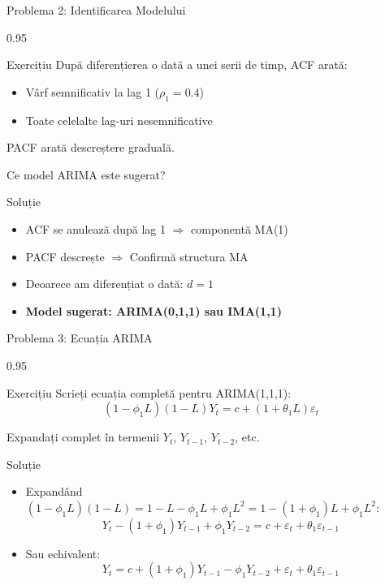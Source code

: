 \documentclass[9pt, aspectratio=169, t]{beamer}
\begin{document}
\begin{frame}{Problema 2: Identificarea Modelului}
    \begin{cminipage}{0.95\textwidth}
    \begin{block}{Exercițiu}
        După diferențierea o dată a unei serii de timp, ACF arată:
        \begin{itemize}\setlength{\itemsep}{0pt}
            \item Vârf semnificativ la lag 1 ($\rho_1 = 0.4$)
            \item Toate celelalte lag-uri nesemnificative
        \end{itemize}
        PACF arată descreștere graduală.

        Ce model ARIMA este sugerat?
    \end{block}

    \vspace{0.3cm}
    \pause
    \begin{exampleblock}{Soluție}
        \begin{itemize}\setlength{\itemsep}{0pt}
            \item ACF se anulează după lag 1 $\Rightarrow$ componentă MA(1)
            \item PACF descrește $\Rightarrow$ Confirmă structura MA
            \item Deoarece am diferențiat o dată: $d = 1$
            \item \textbf{Model sugerat: ARIMA(0,1,1) sau IMA(1,1)}
        \end{itemize}
    \end{exampleblock}
    \end{cminipage}
\end{frame}

\begin{frame}{Problema 3: Ecuația ARIMA}
    \begin{cminipage}{0.95\textwidth}
    \begin{block}{Exercițiu}
        Scrieți ecuația completă pentru ARIMA(1,1,1):
        $$(1-\phi_1 L)(1-L)Y_t = c + (1+\theta_1 L)\varepsilon_t$$

        Expandați complet în termenii $Y_t$, $Y_{t-1}$, $Y_{t-2}$, etc.
    \end{block}

    \vspace{0.3cm}
    \pause
    \begin{exampleblock}{Soluție}
        \begin{itemize}\setlength{\itemsep}{0pt}
        \item Expandând $(1-\phi_1 L)(1-L) = 1 - L - \phi_1 L + \phi_1 L^2 = 1 - (1+\phi_1)L + \phi_1 L^2$:
        $$Y_t - (1+\phi_1)Y_{t-1} + \phi_1 Y_{t-2} = c + \varepsilon_t + \theta_1 \varepsilon_{t-1}$$
        \item Sau echivalent:
        $$Y_t = c + (1+\phi_1)Y_{t-1} - \phi_1 Y_{t-2} + \varepsilon_t + \theta_1 \varepsilon_{t-1}$$
        \end{itemize}
    \end{exampleblock}
    \end{cminipage}
\end{frame}
\end{document}
